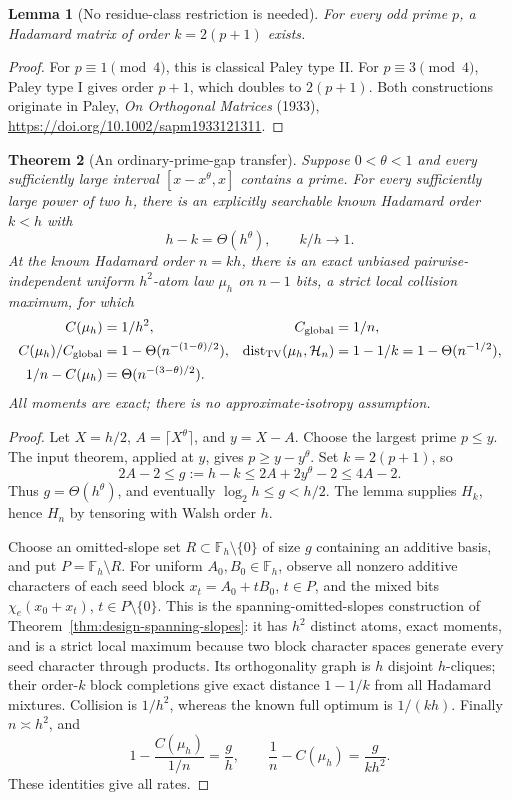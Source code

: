 \documentclass[11pt]{article}
\newtheorem{theorem}{Theorem}[section]
\newtheorem{lemma}[theorem]{Lemma}
\begin{document}
\begin{lemma}[No residue-class restriction is needed]
\label{lem:stability-any-prime}
For every odd prime $p$, a Hadamard matrix of order $k=2(p+1)$ exists.
\end{lemma}
\begin{proof}
For $p\equiv1\pmod4$, this is classical Paley type II. For
$p\equiv3\pmod4$, Paley type I gives order $p+1$, which doubles to
$2(p+1)$. Both constructions originate in Paley,
\emph{On Orthogonal Matrices} (1933),
\url{https://doi.org/10.1002/sapm1933121311}.
\end{proof}

\begin{theorem}[An ordinary-prime-gap transfer]
\label{thm:stability-prime-transfer}
Suppose $0<\theta<1$ and every sufficiently large interval
$[x-x^\theta,x]$ contains a prime. For every sufficiently large power
of two $h$, there is an explicitly searchable known Hadamard order
$k<h$ with
\[
 h-k=\Theta(h^\theta),\qquad k/h\to1.
\]
At the known Hadamard order $n=kh$, there is an exact unbiased
pairwise-independent uniform $h^2$-atom law $\mu_h$ on $n-1$ bits,
a strict local collision maximum, for which
\begin{align*}
 C(\mu_h)&=1/h^2, & C_{\rm global}&=1/n,\\
 C(\mu_h)/C_{\rm global}&=1-\Theta(n^{-(1-\theta)/2}),&
 \operatorname{dist}_{\rm TV}(\mu_h,\mathcal H_n)
 &=1-1/k=1-\Theta(n^{-1/2}),\\
 1/n-C(\mu_h)&=\Theta(n^{-(3-\theta)/2}).
\end{align*}
All moments are exact; there is no approximate-isotropy assumption.
\end{theorem}
\begin{proof}
Let $X=h/2$, $A=\lceil X^\theta\rceil$, and $y=X-A$.
Choose the largest prime $p\le y$. The input theorem, applied at $y$,
gives $p\ge y-y^\theta$. Set $k=2(p+1)$, so
\[
 2A-2\le g:=h-k\le2A+2y^\theta-2\le4A-2.
\]
Thus $g=\Theta(h^\theta)$, and eventually
$\log_2h\le g<h/2$. The lemma supplies $H_k$, hence $H_n$ by tensoring
with Walsh order $h$.

Choose an omitted-slope set $R\subset\mathbb F_h\setminus\{0\}$ of
size $g$ containing an additive basis, and put
$P=\mathbb F_h\setminus R$. For uniform $A_0,B_0\in\mathbb F_h$, observe
all nonzero additive characters of each seed block
$x_t=A_0+tB_0$, $t\in P$, and the mixed bits $\chi_e(x_0+x_t)$,
$t\in P\setminus\{0\}$. This is the spanning-omitted-slopes construction
of Theorem~\ref{thm:design-spanning-slopes}: it has $h^2$ distinct atoms,
exact moments, and is a strict local maximum because two block character
spaces generate every seed character through products. Its orthogonality
graph is $h$ disjoint $h$-cliques; their order-$k$ block completions give
exact distance $1-1/k$ from all Hadamard mixtures. Collision is $1/h^2$,
whereas the known full optimum is $1/(kh)$.
Finally $n\asymp h^2$, and
\[
 1-\frac{C(\mu_h)}{1/n}=\frac gh,\qquad
 \frac1n-C(\mu_h)=\frac{g}{kh^2}.
\]
These identities give all rates.
\end{proof}
\end{document}
